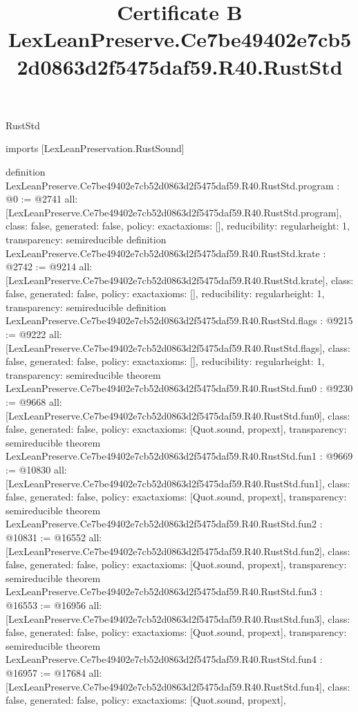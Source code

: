 \begin{lexlean}{RustStd}
\title{Certificate B LexLeanPreserve.Ce7be49402e7cb52d0863d2f5475daf59.R40.RustStd}
\begin{coremodule}
imports [LexLeanPreservation.RustSound]

definition LexLeanPreserve.Ce7be49402e7cb52d0863d2f5475daf59.R40.RustStd.program : @0 := @2741 {
  all: [LexLeanPreserve.Ce7be49402e7cb52d0863d2f5475daf59.R40.RustStd.program],
  class: false,
  generated: false,
  policy: exact{axioms: []},
  reducibility: regular{height: 1},
  transparency: semireducible
}
definition LexLeanPreserve.Ce7be49402e7cb52d0863d2f5475daf59.R40.RustStd.krate : @2742 := @9214 {
  all: [LexLeanPreserve.Ce7be49402e7cb52d0863d2f5475daf59.R40.RustStd.krate],
  class: false,
  generated: false,
  policy: exact{axioms: []},
  reducibility: regular{height: 1},
  transparency: semireducible
}
definition LexLeanPreserve.Ce7be49402e7cb52d0863d2f5475daf59.R40.RustStd.flags : @9215 := @9222 {
  all: [LexLeanPreserve.Ce7be49402e7cb52d0863d2f5475daf59.R40.RustStd.flags],
  class: false,
  generated: false,
  policy: exact{axioms: []},
  reducibility: regular{height: 1},
  transparency: semireducible
}
theorem LexLeanPreserve.Ce7be49402e7cb52d0863d2f5475daf59.R40.RustStd.fun0 : @9230 := @9668 {
  all: [LexLeanPreserve.Ce7be49402e7cb52d0863d2f5475daf59.R40.RustStd.fun0],
  class: false,
  generated: false,
  policy: exact{axioms: [Quot.sound, propext]},
  transparency: semireducible
}
theorem LexLeanPreserve.Ce7be49402e7cb52d0863d2f5475daf59.R40.RustStd.fun1 : @9669 := @10830 {
  all: [LexLeanPreserve.Ce7be49402e7cb52d0863d2f5475daf59.R40.RustStd.fun1],
  class: false,
  generated: false,
  policy: exact{axioms: [Quot.sound, propext]},
  transparency: semireducible
}
theorem LexLeanPreserve.Ce7be49402e7cb52d0863d2f5475daf59.R40.RustStd.fun2 : @10831 := @16552 {
  all: [LexLeanPreserve.Ce7be49402e7cb52d0863d2f5475daf59.R40.RustStd.fun2],
  class: false,
  generated: false,
  policy: exact{axioms: [Quot.sound, propext]},
  transparency: semireducible
}
theorem LexLeanPreserve.Ce7be49402e7cb52d0863d2f5475daf59.R40.RustStd.fun3 : @16553 := @16956 {
  all: [LexLeanPreserve.Ce7be49402e7cb52d0863d2f5475daf59.R40.RustStd.fun3],
  class: false,
  generated: false,
  policy: exact{axioms: [Quot.sound, propext]},
  transparency: semireducible
}
theorem LexLeanPreserve.Ce7be49402e7cb52d0863d2f5475daf59.R40.RustStd.fun4 : @16957 := @17684 {
  all: [LexLeanPreserve.Ce7be49402e7cb52d0863d2f5475daf59.R40.RustStd.fun4],
  class: false,
  generated: false,
  policy: exact{axioms: [Quot.sound, propext]},
}
\end{coremodule}
\end{lexlean}
